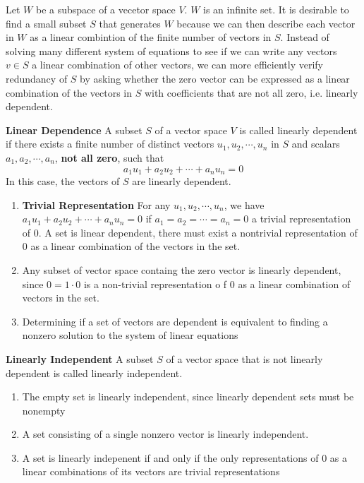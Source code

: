 \documentclass[11pt]{article}
\begin{document}


\begin{rem}
    Let $W$ be a subspace of a vecetor space $V$. $W$ is an infinite set. It is desirable to find a small subset $S$ that generates $W$ because we can then describe each vector in $W$ as a linear combintion of the finite number of vectors in $S$. Instead of solving many different system of equations to see if we can write any vectors $v\in S$ a linear combination of other vectors, we can more efficiently verify redundancy of $S$ by asking whether the zero vector can be expressed as a linear combination of the vectors in $S$ with coefficients that are not all zero, i.e. linearly dependent. 
\end{rem}

\begin{defn*}
    \textbf{Linear Dependence} A subset $S$ of a vector space $V$ is called linearly dependent if there exists a finite number of distinct vectors $u_1, u_2, \cdots, u_n$ in $S$ and scalars $a_1, a_2, \cdots, a_n$, \textbf{not all zero}, such that 
    \[
        a_1 u_1 + a_2 u_2 + \cdots + a_n u_n = 0     
    \]
    In this case, the vectors of $S$ are linearly dependent. 
    \begin{enumerate}
        \item \textbf{Trivial Representation} For any $u_1, u_2 ,\cdots, u_n$, we have $a_1 u_1 + a_2 u_2 + \cdots + a_n u_n = 0$ if $a_1 = a_2 = \cdots = a_n = 0$ a trivial representation of 0. A set is linear dependent, there must exist a nontrivial representation of 0 as a linear combination of the vectors in the set.
        \item Any subset of vector space containg the zero vector is linearly dependent, since $0 = 1\cdot 0$ is a non-trivial representation o f 0 as a linear combination of vectors in the set. 
        \item Determining if a set of vectors are dependent is equivalent to finding a nonzero solution to the system of linear equations
    \end{enumerate}
\end{defn*}


\begin{defn*}
    \textbf{Linearly Independent} A subset $S$ of a vector space that is not linearly dependent is called linearly independent. 
    \begin{enumerate}
        \item The empty set is linearly independent, since linearly dependent sets must be nonempty
        \item A set consisting of a single nonzero vector is linearly independent. 
        \item A set is linearly indepenent if and only if the only representations of 0 as a linear combinations of its vectors are trivial representations
    \end{enumerate}
\end{defn*}
\end{document}
